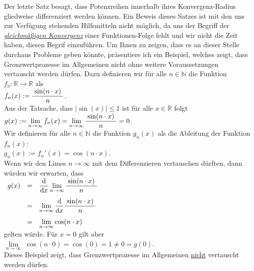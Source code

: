 \remark
Der letzte Satz besagt, dass Potenzreihen innerhalb ihres Konvergenz-Radius gliedweise
differenziert werden k\"onnen.   Ein Beweis dieses Satzes ist mit den uns zur Verf\"ugung
stehenden Hilfsmitteln nicht m\"oglich, da uns der Begriff der
\href{https://en.wikipedia.org/wiki/Uniform_convergence}{\emph{gleichm\"a{\ss}igen Konvergenz}}
einer Funktionen-Folge fehlt und wir nicht die Zeit haben, diesen Begrif einzuf\"uhren.  Um  Ihnen
zu zeigen, dass es an dieser Stelle durchaus Probleme geben k\"onnte, pr\"asentiere ich ein
Beispiel, welches zeigt, dass  
Grenzwertprozesse im Allgemeinen nicht ohne weitere Voraussetzungen vertauscht werden d\"urfen.
Dazu definieren wir f\"ur alle $n \in \mathbb{N}$ die Funktion $f_n:\mathbb{R} \rightarrow \mathbb{R}$ als
\\[0.2cm]
\hspace*{1.3cm}
$\displaystyle f_n(x) := \frac{\;\sin(n \cdot x)\;}{n}$.
\\[0.2cm]
Aus der Tatsache, dass $|\sin(x)| \leq 1$ ist f\"ur alle $x\in \mathbb{R}$ folgt
\\[0.2cm]
\hspace*{1.3cm}
$g(x) := \displaystyle\lim\limits_{n\rightarrow\infty} f_n(x) = \lim\limits_{n\rightarrow\infty} \frac{\;\sin(n \cdot x)\;}{n} = 0$. 
\\[0.2cm]
Wir definieren f\"ur alle $n\in\mathbb{N}$ die Funktion $g_n(x)$ als die Ableitung der Funktion $f_n(x)$:
\\[0.2cm]
\hspace*{1.3cm}
$g_n(x) := f_n'(x) = \cos(n \cdot x)$.
\\[0.2cm]
Wenn wir den Limes $n \rightarrow \infty$ mit dem Differenzieren vertauschen d\"urften, dann
w\"urden wir erwarten, dass 
\\[0.2cm]
\hspace*{1.3cm}
$
\begin{array}[t]{lcl}
g(x) & = & \displaystyle \displaystyle\frac{\textrm{d}}{\textrm{d}x} \lim\limits_{n\rightarrow\infty} \frac{\;\sin(n \cdot x)\;}{n} \\[0.4cm]
     & = & \lim\limits_{n\rightarrow\infty} \displaystyle\frac{\textrm{d}}{\textrm{d}x} \frac{\;\sin(n \cdot x)\;}{n} \\[0.4cm]
     & = & \displaystyle \lim\limits_{n\rightarrow\infty} \cos(n \cdot x) 
\end{array}
$
\\[0.2cm]
gelten w\"urde.  
F\"ur $x = 0$ gilt aber
\\[0.2cm]
\hspace*{1.3cm}
$\lim\limits_{n\rightarrow\infty} \;\cos(n \cdot 0) = \cos(0) = 1 \not= 0 = g(0)$.
\\[0.2cm]
Dieses Beispiel zeigt, dass Grenzwertprozesse im Allgemeinen \underline{nicht} vertauscht werden
d\"urfen. 
\eox

